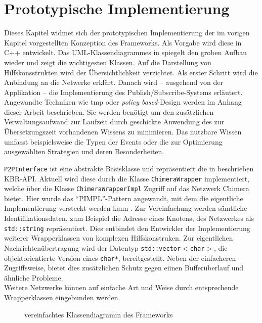 \chapter{Prototypische Implementierung}
\label{chap:impl}
Dieses Kapitel widmet sich der prototypischen Implementierung der im vorigen Kapitel vorgestellten Konzeption des Frameworks. Als Vorgabe wird diese in  C++ entwickelt. Das UML-Klassendiagrammes in  spiegelt den groben Aufbau wieder und zeigt die wichtigesten Klassen. Auf die Darstellung von Hilfskonsstrukten wird der Übersichtlichkeit verzichtet. Als erster Schritt wird die Anbindung an die Netwerke erklärt. Danach wird -- ausgehend von der Applikation -- die Implementierung des Publish/Subscribe-Systems erläutert. Angewandte Techniken wie \ac{tmp} oder \emph{policy based}-Design werden im Anhang dieser Arbeit beschrieben. Sie werden benötigt um den zusätzlichen Verwaltungsaufwand zur Laufzeit durch geschickte Anwendung des zur Übersetzungszeit vorhandenen Wissens zu minimieren. Das nutzbare Wissen umfasst beispielsweise die Typen der Events oder die zur Optimierung ausgewählten Strategien und deren Besonderheiten.

\texttt{P2PInterface} ist eine abstrakte Basisklasse und repräsentiert die in \cite{Dabek2003Towards} beschrieben KBR-API. Aktuell wird diese durch die Klasse \texttt{ChimeraWrapper} implementiert, welche über die Klasse \texttt{ChimeraWrapperImpl} Zugriff auf das Netzwerk Chimera bietet. Hier wurde das ``PIMPL''-Pattern angewandt, mit dem die eigentliche Implementierung versteckt werden kann \cite{Alexandrescu2001Modern}. Zur Vereinfachung werden sämtliche Identifikationsdaten, zum Beispiel die Adresse eines Knotens, des Netzwerkes als \texttt{std::string} repräsentiert. Dies entbindet den Entwickler der Implementierung weiterer Wrapperklassen von komplexen Hilfskonstruken. Zur eigentlichen Nachrichtenübertragung wird der Datentyp \texttt{std::vector$<$char$>$}, die objektorientierte Version eines \texttt{char*}, bereitgestellt. Neben der einfacheren Zugriffsweise, bietet dies zusätzlichen Schutz gegen eiinen Bufferüberlauf und ähnliche Probleme.\\
Weitere Netzwerke können auf einfache Art und Weise durch entsprechende Wrapperklassen eingebunden werden.

\begin{figure}[htbp]
\centering
{}
\caption{vereinfachtes Klassendiagramm des Frameworks}
\label{fig:uml}
\end{figure}

